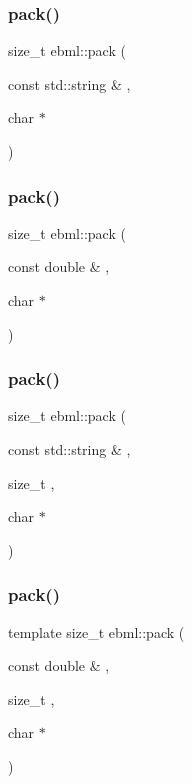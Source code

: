 \subsubsection{\texorpdfstring{pack()}{pack()}\hspace{0.1cm}{\footnotesize\ttfamily [13/24]}}
{\footnotesize\ttfamily size\+\_\+t ebml\+::pack (\begin{DoxyParamCaption}\item[{const std\+::string \&}]{,  }\item[{char $\ast$}]{ }\end{DoxyParamCaption})}

\mbox{\label{namespaceebml_ad562523994b9b844a2ed42f2c9dc0743}} 
\subsubsection{\texorpdfstring{pack()}{pack()}\hspace{0.1cm}{\footnotesize\ttfamily [14/24]}}
{\footnotesize\ttfamily size\+\_\+t ebml\+::pack (\begin{DoxyParamCaption}\item[{const double \&}]{,  }\item[{char $\ast$}]{ }\end{DoxyParamCaption})}

\mbox{\label{namespaceebml_a436b47856669dd55e115bb9144e4e543}} 
\subsubsection{\texorpdfstring{pack()}{pack()}\hspace{0.1cm}{\footnotesize\ttfamily [15/24]}}
{\footnotesize\ttfamily size\+\_\+t ebml\+::pack (\begin{DoxyParamCaption}\item[{const std\+::string \&}]{,  }\item[{size\+\_\+t}]{,  }\item[{char $\ast$}]{ }\end{DoxyParamCaption})}

\mbox{\label{namespaceebml_a027af75ad19fec2ebab68496ee378985}} 
\subsubsection{\texorpdfstring{pack()}{pack()}\hspace{0.1cm}{\footnotesize\ttfamily [16/24]}}
{\footnotesize\ttfamily template size\+\_\+t ebml\+::pack (\begin{DoxyParamCaption}\item[{const double \&}]{,  }\item[{size\+\_\+t}]{,  }\item[{char $\ast$}]{ }\end{DoxyParamCaption})}

